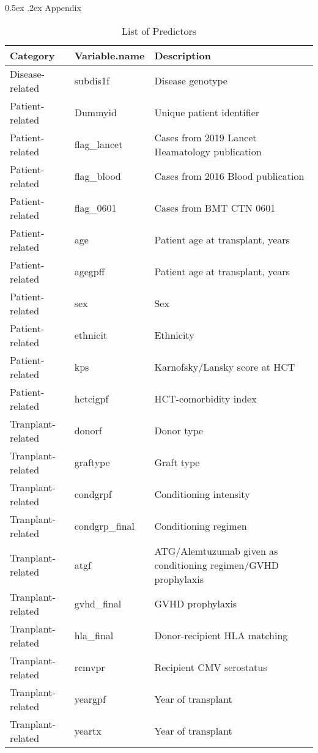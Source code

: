 \documentclass[11pt,]{article}
\makeatletter
\renewcommand\subsubsection{
  \@startsection{subsubsection}{3}{\z@}
    {-1.0ex\@plus -1ex \@minus -.2ex}%
    {0.5ex \@plus .2ex}%
    {\normalfont\normalsize\bf}} %
\makeatother
\begin{document}
\pagebreak

\hypertarget{appendix}{%
\subsubsection{Appendix}\label{appendix}}

\begin{longtable}[t]{|>{}ll>{}l|}
\caption{\label{tab:unnamed-chunk-6}List of Predictors}\\
\toprule
Category & Variable.name & Description\\
\midrule
Disease-related & subdis1f & Disease genotype\\
Patient-related & Dummyid & Unique patient identifier\\
Patient-related & flag\_lancet & Cases from 2019 Lancet Heamatology publication\\
Patient-related & flag\_blood & Cases from 2016 Blood publication\\
Patient-related & flag\_0601 & Cases from BMT CTN 0601\\
\addlinespace
Patient-related & age & Patient age at transplant, years\\
Patient-related & agegpff & Patient age at transplant, years\\
Patient-related & sex & Sex\\
Patient-related & ethnicit & Ethnicity\\
Patient-related & kps & Karnofsky/Lansky score at HCT\\
\addlinespace
Patient-related & hctcigpf & HCT-comorbidity index\\
Tranplant-related & donorf & Donor type\\
Tranplant-related & graftype & Graft type\\
Tranplant-related & condgrpf & Conditioning intensity\\
Tranplant-related & condgrp\_final & Conditioning regimen\\
\addlinespace
Tranplant-related & atgf & ATG/Alemtuzumab given as conditioning regimen/GVHD prophylaxis\\
Tranplant-related & gvhd\_final & GVHD prophylaxis\\
Tranplant-related & hla\_final & Donor-recipient HLA matching\\
Tranplant-related & rcmvpr & Recipient CMV serostatus\\
Tranplant-related & yeargpf & Year of transplant\\
\addlinespace
Tranplant-related & yeartx & Year of transplant\\
\bottomrule
\end{longtable}
\end{document}
